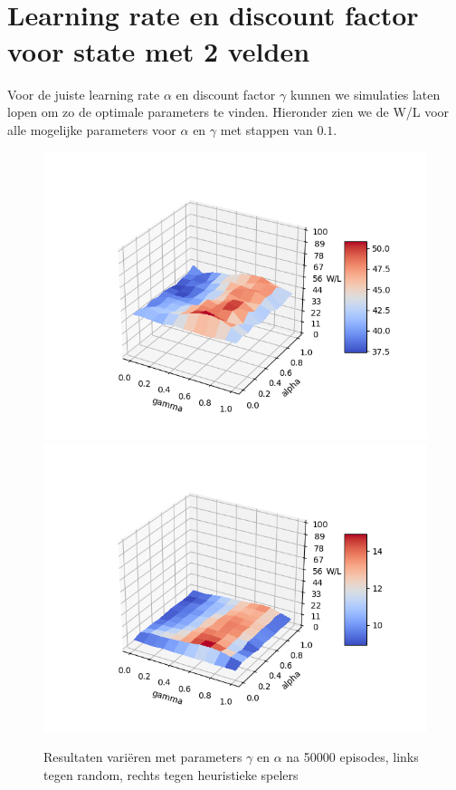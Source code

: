 \documentclass[11pt]{article}
\begin{document}
\section{\\Learning rate en discount factor voor state met 2 velden}
\label{appendix:parameters}
Voor de juiste learning rate $\alpha$ en discount factor $\gamma$ kunnen we simulaties laten lopen om zo de optimale parameters te vinden. Hieronder zien we de W/L voor alle mogelijke parameters voor $\alpha$ en $\gamma$ met stappen van $0.1$.
\begin{figure}[h]
\centering
\includegraphics[scale=0.50]{images/qtable_parameter_random.png}
\includegraphics[scale=0.50]{images/qtable_parameter_heuristic.png}
\caption{Resultaten variëren met parameters $\gamma$ en $\alpha$ na 50000 episodes, links tegen random, rechts tegen heuristieke spelers}
\end{figure}
\end{document}
